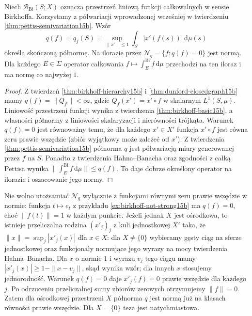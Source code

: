 \begin{stwierdzenie}
\label{prop:birkhoff-seminorm15b}
Niech $\mathcal B_{\mathrm{Bi}}(S;X)$ oznacza przestrzeń
liniową funkcji całkowalnych w sensie Birkhoffa.
Korzystamy z półwariacji wprowadzonej wcześniej
w twierdzeniu \ref{thm:pettis-semivariation15b}. Wzór
\[
 q(f)=q_f(S)=\sup_{\|x'\|\le1}\int_S|x'(f(s))|\,\mathrm d\mu(s)
\]
określa skończoną półnormę. Na ilorazie przez
$\mathcal N_q=\{f:q(f)=0\}$ jest normą.
Dla każdego $E\in\Sigma$ operator całkowania
$f\mapsto\int_E^{\mathrm{Bi}} f\,\mathrm d\mu$
przechodzi na ten iloraz i ma normę co najwyżej $1$.
\end{stwierdzenie}
\begin{proof}
Z twierdzeń \ref{thm:birkhoff-hierarchy15b}
i \ref{thm:dunford-closedgraph15b} mamy
$q(f)=\|Q_f\|<\infty$, gdzie
$Q_f(x')=x'\circ f$ w skalarnym $L^1(S,\mu)$.
Liniowość przestrzeni funkcji wynika z twierdzenia
\ref{thm:birkhoff-basic15b}, a własności półnormy
z liniowości skalaryzacji i nierówności trójkąta.
Warunek $q(f)=0$ jest równoważny temu, że
dla każdego $x'\in X'$ funkcja $x'\circ f$
jest równa zeru prawie wszędzie (zbiór wyjątkowy
może zależeć od $x'$). Z twierdzenia
\ref{thm:pettis-semivariation15b} półnorma $q$
jest półwariacją miary generowanej przez $f$ na $S$.
Ponadto z twierdzenia Hahna--Banacha oraz
zgodności z całką Pettisa wynika
$\|\int_E^{\mathrm{Bi}} f\,\mathrm d\mu\|\le q(f)$.
To daje dobrze określony operator na ilorazie
i oszacowanie jego normy.
\end{proof}

\begin{uwaga}
Nie wolno utożsamiać $\mathcal N_q$ wyłącznie
z funkcjami równymi zeru prawie wszędzie w normie:
funkcja $t\mapsto e_t$ z przykładu
\ref{ex:birkhoff-not-strong15b} ma $q(f)=0$,
choć $\|f(t)\|=1$ w każdym punkcie.
Jeżeli jednak $X$ jest ośrodkowa, to istnieje
przeliczalna rodzina $(x'_j)_j$ z kuli jednostkowej
$X'$ taka, że $\|x\|=\sup_j|x'_j(x)|$ dla $x\in X$:
dla $X\ne\{0\}$ wybieramy gęsty ciąg na sferze
jednostkowej oraz funkcjonały normujące jego wyrazy
na mocy twierdzenia Hahna--Banacha.
Dla $x$ o normie $1$ i wyrazu $v_j$ tego ciągu mamy
$|x'_j(x)|\ge1-\|x-v_j\|$, skąd wynika wzór;
dla innych $x$ stosujemy jednorodność.
Warunek $q(f)=0$ daje $x'_j(f)=0$ prawie wszędzie
dla każdego $j$. Po odrzuceniu przeliczalnej sumy
zbiorów zerowych otrzymujemy $\|f\|=0$.
Zatem dla ośrodkowej przestrzeni $X$ półnorma $q$
jest normą już na klasach równości prawie wszędzie.
Dla $X=\{0\}$ teza jest natychmiastowa.
\end{uwaga}

